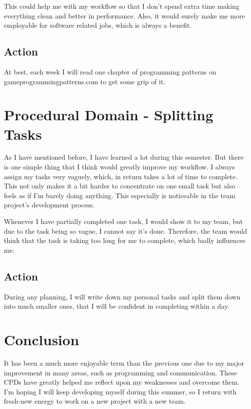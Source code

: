 \documentclass{scrartcl}
\begin{document}
This could help me with my workflow so that I don't spend extra time making everything clean and better in performance. Also, it would surely make me more employable for software related jobs, which is always a benefit.

\subsection{Action}
At best, each week I will read one chapter of programming patterns on gameprogrammingpatterns.com to get some grip of it.

\section{Procedural Domain - Splitting Tasks}
As I have mentioned before, I have learned a lot during this semester. But there is one simple thing that I think would greatly improve my workflow. I always assign my tasks very vaguely, which, in return takes a lot of time to complete. This not only makes it a bit harder to concentrate on one small task but also feels as if I'm barely doing anything. This especially is noticeable in the team project's development process.

Whenever I have partially completed one task, I would show it to my team, but due to the task being so vague, I cannot say it's done. Therefore, the team would think that the task is taking too long for me to complete, which badly influences me.

\subsection{Action}
During any planning, I will write down my personal tasks and split them down into much smaller ones, that I will be confident in completing within a day.

\section{Conclusion}
It has been a much more enjoyable term than the previous one due to my major improvement in many areas, such as programming and communication. These CPDs have greatly helped me reflect upon my weaknesses and overcome them. I'm hoping I will keep developing myself during this summer, so I return with fresh-new energy to work on a new project with a new team.



\end{document}
